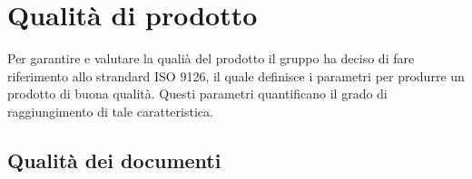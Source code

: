 \section{Qualità di prodotto}
	Per garantire e valutare la qualià del prodotto il gruppo ha deciso di fare riferimento allo strandard ISO 9126, il quale definisce i parametri per produrre un prodotto di buona qualità. Questi parametri quantificano il grado di raggiungimento di tale caratteristica.
%		
%		
%		
%		
%		
	\subsection{Qualità dei documenti}
		
